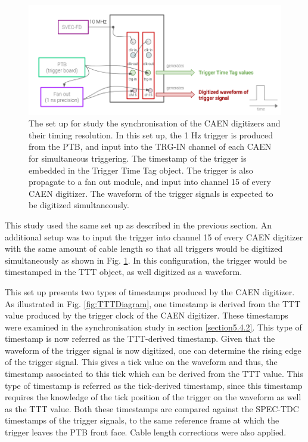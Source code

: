 \begin{figure}[htbp!] 
\centering    
\includegraphics[width=1.0\textwidth]{digitize_ftrig}
\caption[digitizeFTRIG]{
The set up for study the synchronisation of the CAEN digitizers and their timing resolution.
In this set up, the 1 Hz trigger is produced from the PTB, and input into the TRG-IN channel of each CAEN for simultaneous triggering.
The timestamp of the trigger is embedded in the Trigger Time Tag object.
The trigger is also propagate to a fan out module, and input into channel 15 of every CAEN digitizer.
The waveform of the trigger signals is expected to be digitized simultaneously. 
}
\label{fig:digitizeFTRIG}
\end{figure}

This study used the same set up as described in the previous section.
An additional setup was to input the trigger into channel 15 of every CAEN digitizer with the same amount of cable length so that all triggers would be digitized simultaneously as shown in Fig. \ref{fig:digitizeFTRIG}.
In this configuration, the trigger would be timestamped in the TTT object, as well digitized as a waveform. 

This set up presents two types of timestamps produced by the CAEN digitizer.
As illustrated in Fig. \ref {fig:TTTDiagram}, one timestamp is derived from the TTT value produced by the trigger clock of the CAEN digitizer.
These timestamps were examined in the synchronisation study in section \ref{section5.4.2}.
This type of timestamp is now referred as the TTT-derived timestamp.
Given that the waveform of the trigger signal is now digitized, one can determine the rising edge of the trigger signal.
This gives a tick value on the waveform and thus, the timestamp associated to this tick which can be derived from the TTT value.
This type of timestamp is referred as the tick-derived timestamp, since this timestamp requires the knowledge of the tick position of the trigger on the waveform as well as the TTT value.
Both these timestamps are compared against the SPEC-TDC timestamps of the trigger signals, to the same reference frame at which the trigger leaves the PTB front face.
Cable length corrections were also applied.

